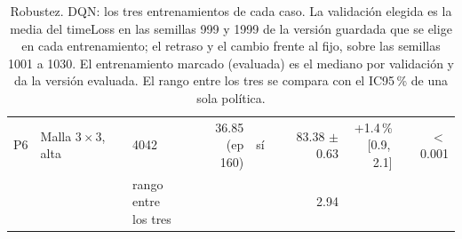 \begin{table}[H]
\begin{tabular}{lllrlrrr}
P6 & \makecell[l]{Malla $3 \times 3$,\\{}alta} & 4042 & \makecell[r]{36.85\\{}(ep 160)} & sí & \makecell[r]{83.38\\{}$\pm$ 0.63} & \makecell[r]{+1.4\,\%\\{}[0.9,\,2.1]} & $<$\,0.001 \\
 & & \makecell[l]{rango entre\\{}los tres} & & & 2.94 & & \\
\bottomrule
\end{tabular}
\caption[Robustez: entrenamientos de DQN]{Robustez. DQN: los tres entrenamientos de cada caso. La validación elegida es la media del timeLoss en las semillas 999 y 1999 de la versión guardada que se elige en cada entrenamiento; el retraso y el cambio frente al fijo, sobre las semillas 1001 a 1030. El entrenamiento marcado (evaluada) es el mediano por validación y da la versión evaluada. El rango entre los tres se compara con el IC95\,\% de una sola política.}
\label{tab:robustez-veredicto-bases-dqn}
\end{table}

